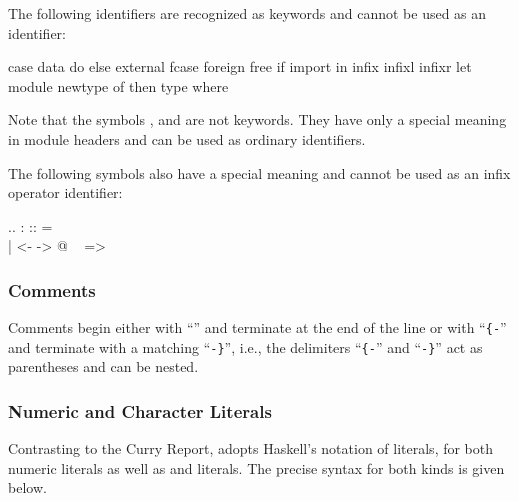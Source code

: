 The following identifiers are recognized as keywords
and cannot be used as an identifier:
\begin{curry}
case      data      do        else      external  fcase     foreign
free      if        import    in        infix     infixl    infixr
let       module    newtype   of        then      type      where
\end{curry}

Note that the symbols , 
and  are not keywords.
They have only a special meaning in module headers
and can be used as ordinary identifiers.

The following symbols also have a special meaning and cannot
be used as an infix operator identifier:
\begin{curry}
..    :     ::    =     \\     |     <-    ->    @     ~     =>
\end{curry}

\subsubsection{Comments}

Comments begin either with ``\term{--}'' and terminate at the end of the line
or with ``\verb|{-|'' and terminate with a matching ``\verb|-}|'', i.e.,
the delimiters ``\verb|{-|'' and ``\verb|-}|''
act as parentheses and can be nested.

\subsubsection{Numeric and Character Literals}

Contrasting to the Curry Report, \CYS adopts Haskell's notation of literals,
for both numeric literals as well as  and  literals.
The precise syntax for both kinds is given below.

